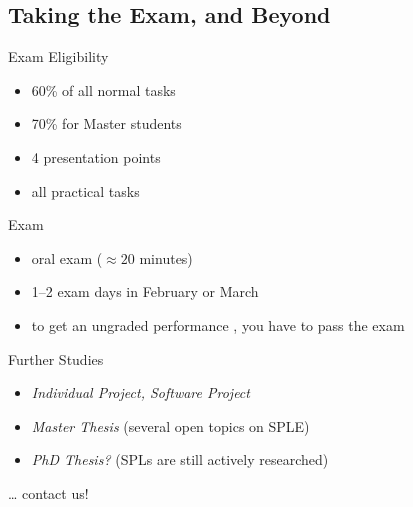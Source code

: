 \subsection{Taking the Exam, and Beyond}

\begin{frame}{\myframetitle}
	\begin{mycolumns}
		\begin{definition}{Exam Eligibility }
			\begin{itemize}
				\item 60\% of all normal tasks 
				\item 70\% for Master students
				\item 4 presentation points 
				\item all practical tasks
			\end{itemize}
		\end{definition}
	\mynextcolumn
		\begin{definition}{Exam}
			\begin{itemize}
				\item oral exam ($\approx 20$ minutes)
				\item 1--2 exam days in February or March
				\item to get an ungraded performance , you have to pass the exam
			\end{itemize}
		\end{definition}
		\begin{example}{Further Studies}
			\begin{itemize}
				\item \emph{Individual Project, Software Project}
				\item \emph{Master Thesis} (several open topics on SPLE)
				\item \emph{PhD Thesis?} (SPLs are still actively researched)
			\end{itemize}
			\ldots{} contact us!
		\end{example}
	\end{mycolumns}
\end{frame}
